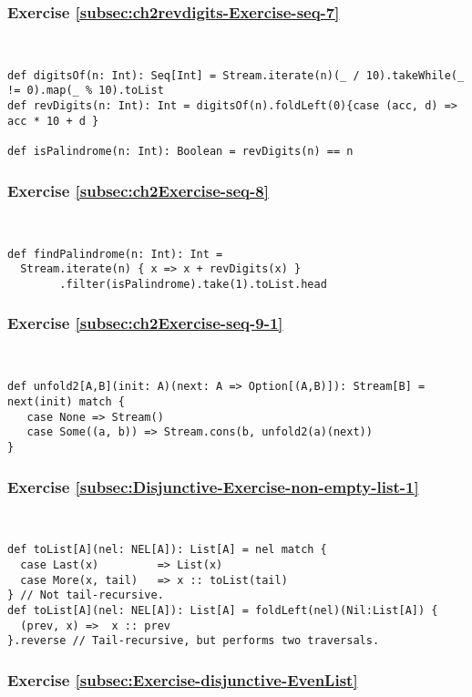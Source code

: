 \subsubsection*{Exercise \ref{subsec:ch2revdigits-Exercise-seq-7}}

~
\begin{lstlisting}
def digitsOf(n: Int): Seq[Int] = Stream.iterate(n)(_ / 10).takeWhile(_ != 0).map(_ % 10).toList
def revDigits(n: Int): Int = digitsOf(n).foldLeft(0){case (acc, d) => acc * 10 + d }

def isPalindrome(n: Int): Boolean = revDigits(n) == n
\end{lstlisting}


\subsubsection*{Exercise \ref{subsec:ch2Exercise-seq-8}}

~
\begin{lstlisting}
def findPalindrome(n: Int): Int = 
  Stream.iterate(n) { x => x + revDigits(x) }
        .filter(isPalindrome).take(1).toList.head
\end{lstlisting}


\subsubsection*{Exercise \ref{subsec:ch2Exercise-seq-9-1}}

~
\begin{lstlisting}
def unfold2[A,B](init: A)(next: A => Option[(A,B)]): Stream[B] = next(init) match {
   case None => Stream()
   case Some((a, b)) => Stream.cons(b, unfold2(a)(next))
}
\end{lstlisting}


\subsubsection*{Exercise \ref{subsec:Disjunctive-Exercise-non-empty-list-1}}

~
\begin{lstlisting}
def toList[A](nel: NEL[A]): List[A] = nel match {
  case Last(x)         => List(x)
  case More(x, tail)   => x :: toList(tail)
} // Not tail-recursive.
def toList[A](nel: NEL[A]): List[A] = foldLeft(nel)(Nil:List[A]) {
  (prev, x) =>  x :: prev
}.reverse // Tail-recursive, but performs two traversals.
\end{lstlisting}


\subsubsection*{Exercise \ref{subsec:Exercise-disjunctive-EvenList}}

